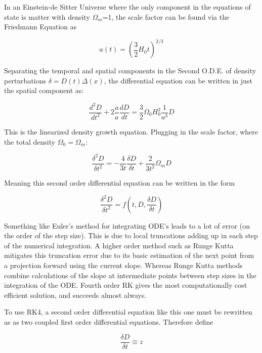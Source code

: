 


In an Einstein-de Sitter Universe where the only component in the equations of state is matter with density $\Omega_m$=1, the scale factor can be found via the Friedmann Equation as

\begin{equation}
  a(t) = \left(\frac{3}{2}H_0t\right)^{2/3}
\end{equation}

Separating the temporal and spatial components in the Second O.D.E. of density perturbations $\delta = D(t)\Delta(x)$, the differential equation can be written in just the spatial component as:

\begin{equation}
  \frac{d^2D}{dt^2}+2\frac{\dot{a}}{a}\frac{dD}{dt}=\frac{3}{2}\Omega_0H_0^2\frac{1}{a^3}D
\end{equation}

This is the linearized density growth equation. Plugging in the scale factor, where the total density $\Omega_0 = \Omega_m$:

\begin{equation}
  \frac{\delta^2D}{\delta t^2}=-\frac{4}{3t}\frac{\delta D}{\delta t}+\frac{2}{3t^2}\Omega_mD
\end{equation}

Meaning this second order differential equation can be written in the form

\begin{equation}
  \frac{\delta^2D}{\delta t^2}=f\left(t,D,\frac{\delta D}{\delta t}\right)
\end{equation}

Something like Euler's method for integrating ODE's leads to a lot of error (on the order of the step size). This is due to local truncations adding up in each step of the numerical integration. A higher order method such as Runge Kutta mitigates this truncation error due to its basic estimation of the next point from a projection forward using the current slope. Whereas Runge Kutta methods combine calculations of the slope at intermediate points between step sizes in the integration of the ODE. Fourth order RK gives the most computationally cost efficient solution, and succeeds almost always.

To use RK4, a second order differential equation like this one must be rewritten as as two coupled first order differential equations. Therefore define

\begin{equation}
  \frac{\delta D}{\delta t} \equiv z
\end{equation}


